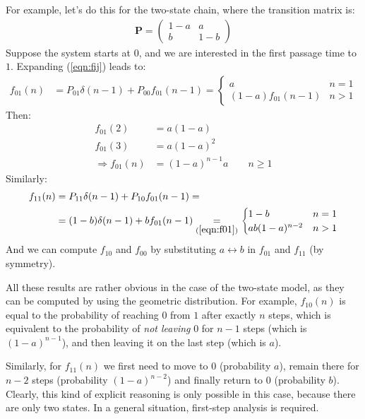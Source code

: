 \documentclass[../template.tex]{subfiles}
\begin{document}
For example, let's do this for the two-state chain, where the transition matrix is:
\begin{align*}
    \textbf{P} = \left(\begin{array}{cc}
    1-a & a \\ 
    b & 1-b
    \end{array}\right)
\end{align*}
Suppose the system starts at $0$, and we are interested in the first passage time to $1$. Expanding (\ref{eqn:fij}) leads to:
\begin{align*}
    f_{01}(n) &= P_{01} \delta(n-1) + P_{00} f_{01}(n-1) = \begin{cases}
        a & n=1\\
        (1-a) f_{01}(n-1) & n > 1
    \end{cases}
\end{align*}
Then:
\begin{align} \nonumber
    f_{01}(2) &= a(1-a)\\  \nonumber
    f_{01}(3) &= a (1-a)^2\\
    \Rightarrow f_{01}(n) &= (1-a)^{n-1} a \qquad n\geq 1
    \label{eqn:f01}
\end{align}
Similarly:
\begin{align*}
    f_{11}(n) &= P_{11} \delta(n-1) + P_{10} f_{01}(n-1) =\\
    &= (1-b) \delta(n-1) + b f_{01}(n-1) \underset{(\ref{eqn:f01})}{=}  \begin{cases}
        1 - b & n=1\\
        a b (1-a)^{n-2} & n>1
    \end{cases}
\end{align*}
And we can compute $f_{10}$ and $f_{00}$ by substituting $a \leftrightarrow b$ in $f_{01}$ and $f_{11}$ (by symmetry).

\medskip

All these results are rather obvious in the case of the two-state model, as they can be computed by using the geometric distribution. For example, $f_{10}(n)$ is equal to the probability of reaching $0$ from $1$ after exactly $n$ steps, which is equivalent to the probability of \textit{not leaving} $0$ for $n-1$ steps (which is $(1-a)^{n-1}$), and then leaving it on the last step (which is $a$). 

Similarly, for $f_{11}(n)$ we first need to move to $0$ (probability $a$), remain there for $n-2$ steps (probability $(1-a)^{n-2}$) and finally return to $0$ (probability $b$). Clearly, this kind of explicit reasoning is only possible in this case, because there are only two states. In a general situation, first-step analysis is required.
\end{document}
